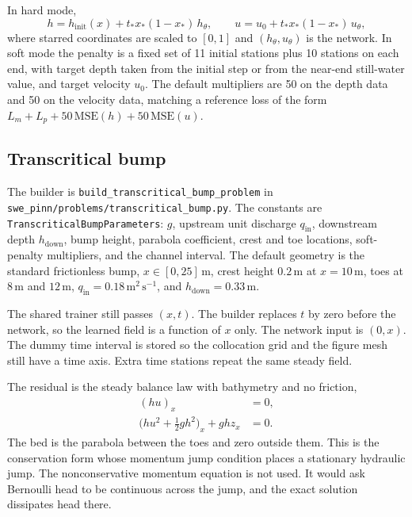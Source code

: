 \documentclass[11pt]{article}
\begin{document}
In hard mode,
\begin{equation}
h=h_{\mathrm{init}}(x)+t_{\ast}x_{\ast}(1-x_{\ast})\,h_{\theta},
\qquad
u=u_{0}+t_{\ast}x_{\ast}(1-x_{\ast})\,u_{\theta},
\end{equation}
where starred coordinates are scaled to \([0,1]\) and \((h_{\theta},u_{\theta})\) is the network.
In soft mode the penalty is a fixed set of 11 initial stations plus 10 stations on each end, with target depth taken from the initial step or from the near-end still-water value, and target velocity \(u_{0}\).
The default multipliers are 50 on the depth data and 50 on the velocity data, matching a reference loss of the form \(L_{m}+L_{p}+50\,\mathrm{MSE}(h)+50\,\mathrm{MSE}(u)\).

\subsection{Transcritical bump}

The builder is \texttt{build\_transcritical\_bump\_problem} in \texttt{swe\_pinn/problems/transcritical\_bump.py}.
The constants are \texttt{TranscriticalBumpParameters}: \(g\), upstream unit discharge \(q_{\mathrm{in}}\), downstream depth \(h_{\mathrm{down}}\), bump height, parabola coefficient, crest and toe locations, soft-penalty multipliers, and the channel interval.
The default geometry is the standard frictionless bump, \(x\in[0,25]\,\mathrm{m}\), crest height \(0.2\,\mathrm{m}\) at \(x=10\,\mathrm{m}\), toes at \(8\,\mathrm{m}\) and \(12\,\mathrm{m}\), \(q_{\mathrm{in}}=0.18\,\mathrm{m^{2}\,s^{-1}}\), and \(h_{\mathrm{down}}=0.33\,\mathrm{m}\).

The shared trainer still passes \((x,t)\).
The builder replaces \(t\) by zero before the network, so the learned field is a function of \(x\) only.
The network input is \((0,x)\).
The dummy time interval is stored so the collocation grid and the figure mesh still have a time axis.
Extra time stations repeat the same steady field.

The residual is the steady balance law with bathymetry and no friction,
\begin{align}
(hu)_{x}&=0,\\
\big(hu^{2}+\tfrac12 g h^{2}\big)_{x}+g h z_{x}&=0.
\end{align}
The bed is the parabola between the toes and zero outside them.
This is the conservation form whose momentum jump condition places a stationary hydraulic jump.
The nonconservative momentum equation is not used.
It would ask Bernoulli head to be continuous across the jump, and the exact solution dissipates head there.
\end{document}
